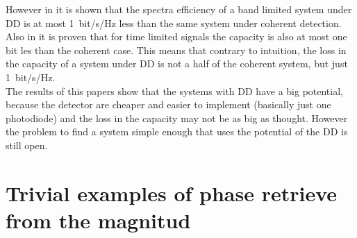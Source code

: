 However in \cite{Mecozzi_2018} it is shown that the spectra efficiency of a band limited system under DD is at most \SI{1}{bit/\s/\Hz} less than the same system under coherent detection. Also in \cite{Tasbihi_Capacity} it is proven that for time limited signals  the capacity is also at most one bit les than the coherent case. This means that contrary to intuition, the loss in the capacity of a system under DD is not a half of the coherent system, but just \SI{1}{bit/\s/\Hz}.\\

The results of this papers show that the systems with DD have a big potential, because the detector are cheaper and easier to implement (basically just one photodiode) and the loss in the capacity may not be as big as thought. However the problem to find a system simple enough that uses the potential of the DD is still open. 



\section{Trivial examples of phase retrieve from the magnitud}






























